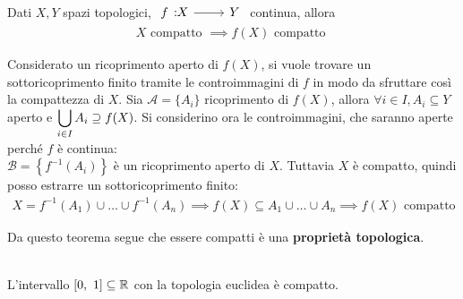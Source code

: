 \begin{theorema}\label{immagine compatto}
	Dati $X,Y$ spazi topologici, $\funz f X Y$ continua, allora
		\begin{gather*}
			X \text{ compatto } \implies f(X) \text{ compatto }
		\end{gather*}
	\vspace{-6mm}
\end{theorema}
\begin{demonstration}
	Considerato un ricoprimento aperto di $f(X)$, si vuole trovare un sottoricoprimento finito tramite le controimmagini di $f$ in modo da sfruttare così la compattezza di $X$. \newline
	Sia  $\mathcal{A}=\{A_i\}$ ricoprimento di $f(X)$, allora $\forall i\in I, A_i\subseteq Y$ aperto e $\displaystyle \mathop{{\bigcup}}\displaylimits_{i\in I}A_i \supseteq f(X)$. \newline
	Si considerino ora le controimmagini, che saranno aperte perché $f$ è continua:\\
	$\mathcal{B}=\left\{f^{-1}(A_i)\right\}$ è un ricoprimento aperto di $X$. Tuttavia $X$ è compatto, quindi posso estrarre un sottoricoprimento finito:
		\begin{gather*}
			X=f^{-1}(A_1) \cup	\dots \cup f^{-1}(A_n) \implies f(X)\subseteq A_1\cup \dots \cup A_n \implies f(X) \text{ compatto}
		\end{gather*}
	\vspace{-6mm}
\end{demonstration}
Da questo teorema segue che essere compatti è una \textbf{proprietà topologica}.
\begin{theorema}[${[0,\ 1]}$ è un compatto.]~{}\\
	L'intervallo $[0,\ 1]\subseteq\mathbb{R}$ con la topologia euclidea è compatto.
\end{theorema}

